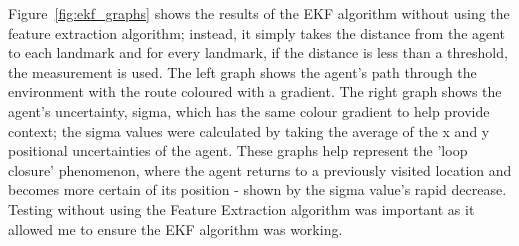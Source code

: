 \documentclass[12pt]{article}
\begin{document}
Figure~\ref{fig:ekf_graphs} shows the results of the EKF algorithm without using the feature extraction algorithm; instead, it simply takes
the distance from the agent to each landmark and for every landmark, if the distance is less than a threshold, the measurement is used.
The left graph shows the agent's path through the environment with the route coloured with a gradient. The right graph shows the agent's
uncertainty, sigma, which has the same colour gradient to help provide context; the sigma values were calculated by taking the average of
the x and y positional uncertainties of the agent. These graphs help represent the 'loop closure' phenomenon, where the agent returns to a
previously visited location and becomes more certain of its position - shown by the sigma value's rapid decrease. Testing without using the
Feature Extraction algorithm was important as it allowed me to ensure the EKF algorithm was working.\\
\end{document}
